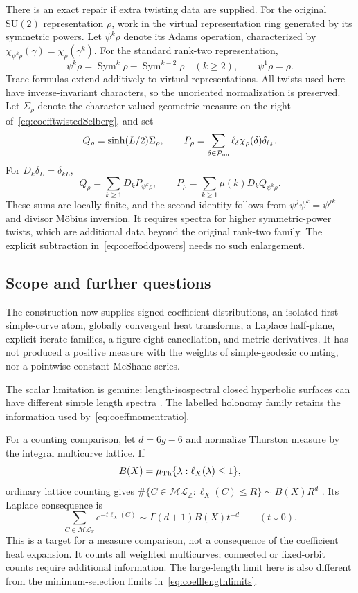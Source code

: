 \documentclass[11pt,a4paper]{article}
\numberwithin{equation}{section}
\theoremstyle{definition}
\theoremstyle{remark}
\newcommand{\ZZ}{\mathbb Z}
\begin{document}
There is an exact repair if extra twisting data are supplied.
For the original $\mathrm{SU}(2)$ representation $\rho$, work in
the virtual representation ring generated by its symmetric powers.
Let $\psi^k\rho$ denote its Adams operation, characterized by
$\chi_{\psi^k\rho}(\gamma)=\chi_\rho(\gamma^k)$. For the
standard rank-two representation,
\[
 \psi^k\rho=\operatorname{Sym}^k\rho-
             \operatorname{Sym}^{k-2}\rho\quad(k\geq2),
 \qquad \psi^1\rho=\rho.
\]
Trace formulas extend additively to virtual representations.
All twists used here have inverse-invariant characters, so the
unoriented normalization is preserved. Let $\Sigma_\rho$ denote the character-valued geometric measure
on the right of~\eqref{eq:coefftwistedSelberg}, and set
\[
 Q_\rho=\sinh(L/2)\Sigma_\rho,\qquad
 P_\rho=\sum_{\delta\in\mathcal P_{\rm un}}
         \ell_\delta\chi_\rho(\delta)\delta_{\ell_\delta}.
\]
For $D_k\delta_L=\delta_{kL}$,
\[
 Q_\rho=\sum_{k\geq1}D_kP_{\psi^k\rho},\qquad
 \boxed{P_\rho=\sum_{k\geq1}\mu(k)D_kQ_{\psi^k\rho}.}
\]
These sums are locally finite, and the second identity follows from
$\psi^j\psi^k=\psi^{jk}$ and divisor M\"obius inversion. It requires
spectra for higher symmetric-power twists, which are additional
data beyond the original rank-two family. The explicit subtraction
in~\eqref{eq:coeffoddpowers} needs no such enlargement.

\subsection{Scope and further questions}

The construction now supplies signed coefficient distributions,
an isolated first simple-curve atom, globally convergent heat
transforms, a Laplace half-plane, explicit iterate families, a
figure-eight cancellation, and metric derivatives. It has not
produced a positive measure with the weights of simple-geodesic
counting, nor a pointwise constant McShane series.

The scalar limitation is genuine: length-isospectral closed
hyperbolic surfaces can have different simple length spectra
\cite{AougabLahnLovingMiller}. The labelled holonomy family retains
the information used by~\eqref{eq:coeffmomentratio}.

For a counting comparison, let $d=6g-6$ and normalize Thurston
measure by the integral multicurve lattice. If
\[
 B(X)=\mu_{\rm Th}\{\lambda:\ell_X(\lambda)\leq1\},
\]
ordinary lattice counting gives
$\#\{C\in\mathcal{ML}_{\ZZ}:\ell_X(C)\leq R\}\sim B(X)R^d$
\cite[Proposition 3.1]{MirzSimple}. Its Laplace consequence is
\[
 \sum_{C\in\mathcal{ML}_{\ZZ}}e^{-t\ell_X(C)}
 \sim\Gamma(d+1)B(X)t^{-d}\qquad(t\downarrow0).
\]
This is a target for a measure comparison, not a consequence of
the coefficient heat expansion. It counts all weighted multicurves;
connected or fixed-orbit counts require additional information.
The large-length limit here is also different from the
minimum-selection limits in~\eqref{eq:coefflengthlimits}.
\end{document}
